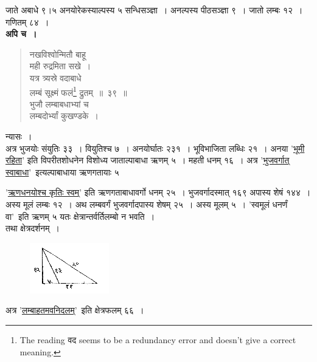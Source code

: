 \documentclass[11pt, openany]{book}
\begin{document}
 जाते अबाधे ९।५ अनयोरेकस्याल्पस्य ५ सन्धिसञ्ज्ञा~। अनल्पस्य पीठसञ्ज्ञा ९~। जातो लम्बः १२~। गणितम् ८४~। \\

\vspace{-2mm}
 \textbf{अपि च~।} 
\begin{quote}
    \bqt 
     नखविश्वोन्मितौ बाहू \\
     मही रुद्रमिता सखे~।\\
यत्र त्र्यस्रे वदाबाधे \\
लम्बं सूक्ष्मं फलं\footnote{The reading वद seems to be a redundancy error and doesn't give a correct meaning.} द्रुतम्~॥~३९~॥ \\
 भुजौ लम्बाबधाभ्यां च \\
 लम्बदोर्भ्यां कुखण्डके~। 
\end{quote}

 न्यासः~। \\

\vspace{-2mm}
 अत्र भुजयोः संयुतिः ३३~। वियुतिश्च ७~। अनयोर्घातः २३१~। 
भूविभाजिता लब्धिः २१~। अनया '\hyperref[4.36]{भूमी रहिता}' इति विपरीतशोधनेन विशोध्य जाताल्पाबाधा ऋणम् ५~। महती धनम् १६~। 
अत्र '\hyperref[4.38]{भुजवर्गात् स्वाबाधा}'\textendash\, इत्यल्पाबाधाया ऋणगतायाः ५
\newpage
\setcounter{footnote}{0}

\noindent '\hyperref[4.7]{ऋणधनयोश्च कृतिः स्वम्}' इति ऋणगताबाधावर्गो धनम् २५~। 
भुजवर्गादस्मात् १६९ अपास्य शेषं १४४~। अस्य मूलं लम्बः १२~। 
अथ लम्बवर्गं भुजवर्गादपास्य शेषम् २५~। अस्य मूलम् ५~। 'स्वमूलं धनर्णं वा'\textendash\ इति ऋणम् ५ यतः क्षेत्रान्तर्वर्तिलम्बो न भवति~। \\

\vspace{-3mm}
 तथा क्षेत्रदर्शनम्~। 
\vspace{-2mm}

\begin{figure}[h!]
    \centering
    \includegraphics[scale=0.85]{graphics/capture45.png}
\end{figure}
\vspace{-2mm}

 अत्र '\hyperref[4.39]{लम्बाहतमवनिदलम्}'\textendash\ इति क्षेत्रफलम् ६६~। \\
\end{document}
